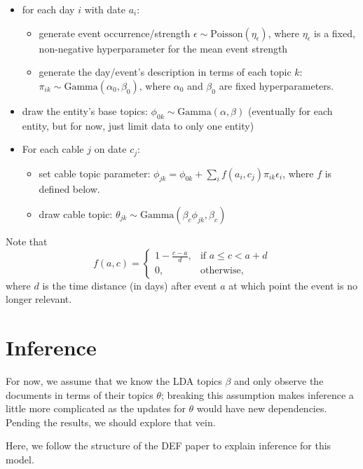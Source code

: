 \begin{itemize}
\item for each day $i$ with date $a_i$:
\begin{itemize}
\item generate event occurrence/strength $\epsilon \sim \mbox{Poisson}
(\eta_\epsilon)$, where $\eta_\epsilon$ is a fixed, non-negative
hyperparameter for the mean event strength
\item generate the day/event's description in terms of each topic $k$: $\pi_{ik} \sim \mbox{Gamma}(\alpha_0, \beta_0)$, where $\alpha_0$ and $\beta_0$ are fixed hyperparameters.
\end{itemize}
\item draw the entity's base topics: $\phi_{0k} \sim \mbox{Gamma}(\alpha, \beta)$ (eventually for each entity, but for now, just limit data to only one entity)
\item For each cable $j$ on date $c_j$:
\begin{itemize}
	\item set cable topic parameter: $\phi_{jk} = \phi_{0k} + \sum_i f(a_i, c_j) \pi_{ik} \epsilon_i$, where $f$ is defined below.
	\item draw cable topic: $\theta_{jk} \sim \mbox{Gamma}(\beta_c \phi_{jk}, \beta_c)$
\end{itemize}
\end{itemize}

\noindent Note that\[f(a, c) =
\begin{cases}
	1 - \frac{c-a}{d}, & \mbox{if } a \le c < a+d \\
	0, & \mbox{otherwise,}
\end{cases} \]
where $d$ is the time distance (in days) after event $a$ at which point the event is no longer relevant.


\section{Inference}
For now, we assume that we know the LDA topics $\beta$ and only observe the documents in terms of their topics $\theta$; breaking this assumption makes inference a little more complicated as the updates for $\theta$ would have new dependencies.  Pending the results, we should explore that vein. 

Here, we follow the structure of the DEF paper to explain inference for this model.

